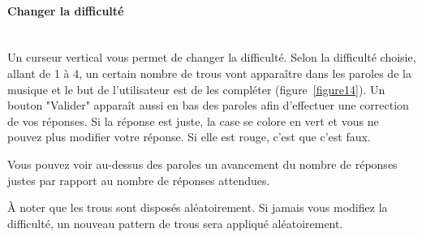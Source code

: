 \documentclass[12pt,french]{article}
\begin{document}
\paragraph{Changer la difficulté \\\\}

Un curseur vertical vous permet de changer la difficulté. Selon la difficulté choisie, allant de 1 à 4, un certain nombre de trous vont apparaître dans les paroles de la musique et le but de l'utilisateur est de les compléter (figure~\ref{figure14}). Un bouton "Valider" apparaît aussi en bas des paroles afin d'effectuer une correction de vos réponses. Si la réponse est juste, la case se colore en vert et vous ne pouvez plus modifier votre réponse. Si elle est rouge, c'est que c'est faux.

Vous pouvez voir au-dessus des paroles un avancement du nombre de réponses justes par rapport au nombre de réponses attendues.

À noter que les trous sont disposés aléatoirement. Si jamais vous modifiez la difficulté, un nouveau pattern de trous sera appliqué aléatoirement.
\end{document}
